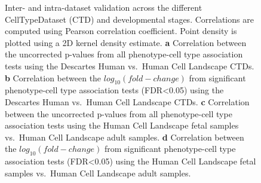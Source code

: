 \documentclass[
]{article}
\begin{document}
\label{cell-fig-ctd-correlation}
\begin{figure}[H]


\caption{\label{fig-ctd-correlation}Inter- and intra-dataset validation
across the different CellTypeDataset (CTD) and developmental stages.
Correlations are computed using Pearson correlation coefficient. Point
density is plotted using a 2D kernel density estimate. \textbf{a}
Correlation between the uncorrected p-values from all phenotype-cell
type association tests using the Descartes Human vs.~Human Cell
Landscape CTDs. \textbf{b} Correlation between the
\(log_{10}(fold-change)\) from significant phenotype-cell type
association tests (FDR\textless0.05) using the Descartes Human vs.~Human
Cell Landscape CTDs. \textbf{c} Correlation between the uncorrected
p-values from all phenotype-cell type association tests using the Human
Cell Landscape fetal samples vs.~Human Cell Landscape adult samples.
\textbf{d} Correlation between the \(log_{10}(fold-change)\) from
significant phenotype-cell type association tests (FDR\textless0.05)
using the Human Cell Landscape fetal samples vs.~Human Cell Landscape
adult samples.}

\end{figure}%
\end{document}
